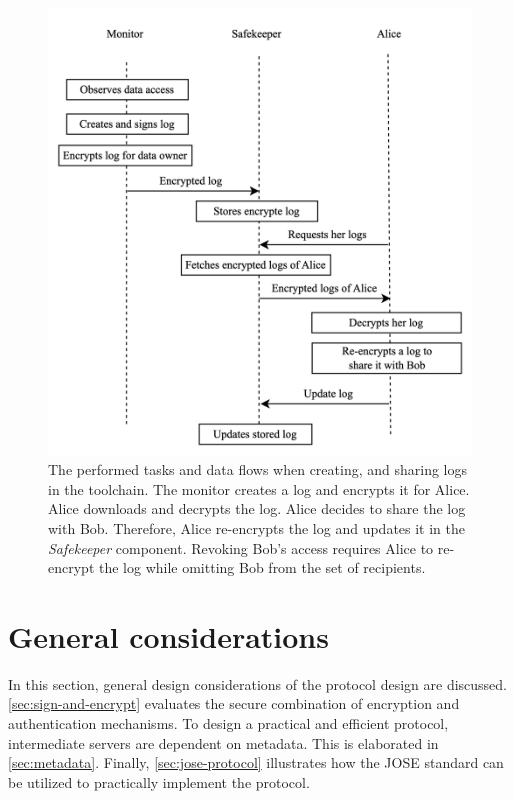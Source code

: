 \documentclass[../main.tex]{subfiles}
\begin{document}
\begin{figure}[h!]
    \includegraphics[width=12.7cm]{../img/05/overview.png}
    \centering
    \caption[Protocol overview]{
        The performed tasks and data flows when creating, and sharing logs in the toolchain.
        The monitor creates a log and encrypts it for Alice.
        Alice downloads and decrypts the log.
        Alice decides to share the log with Bob.
        Therefore, Alice re-encrypts the log and updates it in the \emph{Safekeeper} component.
        Revoking Bob's access requires Alice to re-encrypt the log while omitting Bob from the set of recipients.
    }
    \label{fig:protocol-overview}
\end{figure}

\section{General considerations}
\label{sec:protocol-considerations}
In this section, general design considerations of the protocol design are discussed.
\cref{sec:sign-and-encrypt} evaluates the secure combination of encryption and authentication mechanisms.
To design a practical and efficient protocol, intermediate servers are dependent on metadata.
This is elaborated in \cref{sec:metadata}.
Finally, \cref{sec:jose-protocol} illustrates how the JOSE standard can be utilized to practically implement the protocol.
\end{document}
